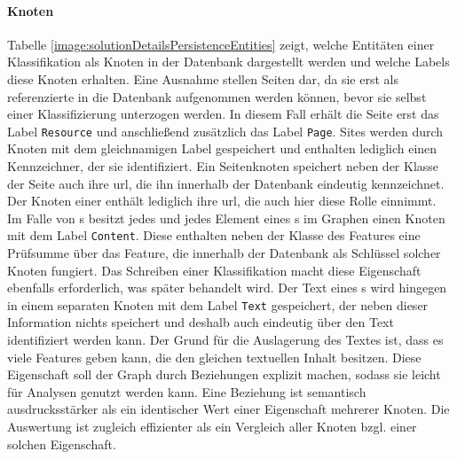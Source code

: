    \paragraph{Knoten}
    Tabelle \ref{image:solutionDetailsPersistenceEntities} zeigt,
    welche Entitäten einer Klassifikation als Knoten in der Datenbank dargestellt werden
    und welche Labels diese Knoten erhalten.
    Eine Ausnahme stellen Seiten dar,
    da sie erst als referenzierte {\resources} in die Datenbank aufgenommen werden können,
    bevor sie selbst einer Klassifizierung unterzogen werden.
    In diesem Fall erhält die Seite erst das Label \texttt{Resource} und anschließend zusätzlich
    das Label \texttt{Page}.
    Sites werden durch Knoten mit dem gleichnamigen Label gespeichert und enthalten lediglich einen
    Kennzeichner, der sie identifiziert.
    Ein Seitenknoten speichert neben der Klasse der Seite auch ihre \gls{url},
    die ihn innerhalb der Datenbank eindeutig kennzeichnet.
    Der Knoten einer {\resource} enthält lediglich ihre \gls{url}, die auch hier diese Rolle einnimmt.
    Im Falle von {\contentFeature}s besitzt jedes {\scalarFeature} und jedes Element eines {\collectionFeature}s
    im Graphen einen Knoten mit dem Label \texttt{Content}.
    Diese enthalten neben der Klasse des Features eine Prüfsumme über das Feature,
    die innerhalb der Datenbank als Schlüssel solcher Knoten fungiert.
    Das Schreiben einer Klassifikation macht diese Eigenschaft ebenfalls erforderlich,
    was später behandelt wird.
    Der Text eines {\contentFeature}s wird hingegen in einem separaten Knoten mit dem Label \texttt{Text} gespeichert,
    der neben dieser Information nichts speichert und deshalb auch eindeutig über den Text identifiziert werden kann.
    Der Grund für die Auslagerung des Textes ist, dass es viele Features geben kann, die den gleichen textuellen Inhalt besitzen.
    Diese Eigenschaft soll der Graph durch Beziehungen explizit machen,
    sodass sie leicht für Analysen genutzt werden kann.
    Eine Beziehung ist semantisch ausdrucksstärker als ein identischer Wert einer Eigenschaft mehrerer Knoten.
    Die Auswertung ist zugleich effizienter als ein Vergleich aller Knoten bzgl. einer solchen Eigenschaft.


